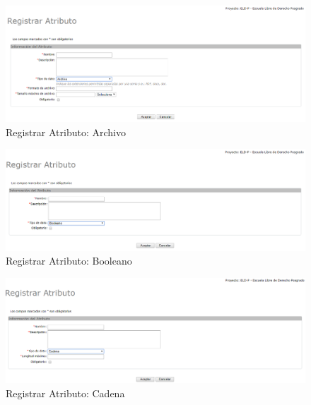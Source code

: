 \begin{enumerate}
			\begin{figure}[H]
				\begin{center}
					\includegraphics[scale=0.5]{roles/lider/entidades/atributos/pantallas/IU12-1-1AregistrarAtributo}
					\caption{Registrar Atributo: Archivo}
					\label{fig:registrarAtributoA}
				\end{center}
			\end{figure}
		
			\begin{figure}[H]
				\begin{center}
					\includegraphics[scale=0.5]{roles/lider/entidades/atributos/pantallas/IU12-1-1BregistrarAtributo}
					\caption{Registrar Atributo: Booleano}
					\label{fig:registrarAtributoB}
				\end{center}
			\end{figure}
		
			\begin{figure}[H]
				\begin{center}
					\includegraphics[scale=0.5]{roles/lider/entidades/atributos/pantallas/IU12-1-1CregistrarAtributo}
					\caption{Registrar Atributo: Cadena}
					\label{fig:registrarAtributoC}
				\end{center}
			\end{figure}
		

\end{enumerate}
